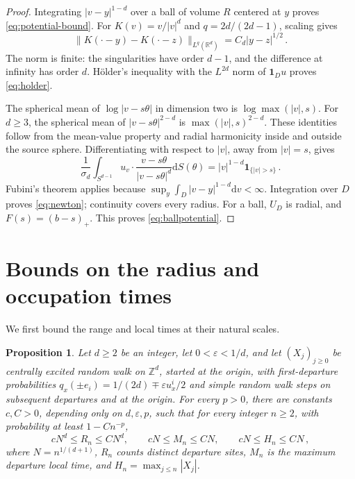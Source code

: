 \documentclass[11pt]{amsart}
\theoremstyle{plain}
\newtheorem{proposition}[theorem]{Proposition}
\theoremstyle{definition}
\newcommand{\Z}{\mathbb Z}
\newcommand{\R}{\mathbb R}
\newcommand{\eps}{\varepsilon}
\newcommand{\ind}{\mathbf 1}
\newcommand{\dd}{\mathrm d}
\begin{document}
\begin{proof}
Integrating $|v-y|^{1-d}$ over a ball of volume $R$ centered at $y$ proves
\eqref{eq:potential-bound}. For $K(v)=v/|v|^d$ and
$q=2d/(2d-1)$, scaling gives
\begin{equation}\label{eq:kernel-modulus}
\|K(\cdot-y)-K(\cdot-z)\|_{L^q(\R^d)}=C_d|y-z|^{1/2}\, .
\end{equation}
The norm is finite: the singularities have order $d-1$, and the
difference at infinity has order $d$. H\"older's inequality with
the $L^{2d}$ norm of $\ind_Du$ proves \eqref{eq:holder}.

The spherical mean of $\log|v-s\theta|$ in dimension two is
$\log\max(|v|,s)$. For $d\geq3$, the spherical mean of
$|v-s\theta|^{2-d}$ is $\max(|v|,s)^{2-d}$.
These identities follow from the mean-value property and radial
harmonicity inside and outside the source sphere.
Differentiating with respect to $|v|$, away from $|v|=s$, gives
\begin{equation}\label{eq:kernel-average}
\frac1{\sigma_d}\int_{S^{d-1}}
u_v\cdot\frac{v-s\theta}{|v-s\theta|^d}\dd S(\theta)
=|v|^{1-d}\ind_{\{|v|>s\}}\, .
\end{equation}
Fubini's theorem applies because
$\sup_y\int_D|v-y|^{1-d}\dd v<\infty$.
Integration over $D$ proves \eqref{eq:newton}; continuity covers
every radius. For a ball, $U_D$ is radial, and
$F(s)=(b-s)_+$. This proves \eqref{eq:ballpotential}.
\end{proof}
\section{Bounds on the radius and occupation times}\label{sec:coarse}
We first bound the range and local times at their natural scales.

\begin{proposition}\label{prop:coarse}
Let $d\geq2$ be an integer, let $0<\eps<1/d$, and let $(X_j)_{j\geq0}$ be centrally
excited random walk on $\Z^d$, started at the origin, with first-departure probabilities
$q_x(\pm e_i)=1/(2d)\mp\eps u_x^i/2$ and simple random walk steps
on subsequent departures and at the origin. For every $p>0$, there are constants
$c,C>0$, depending only on $d,\eps,p$, such that for every integer
$n\geq2$, with probability at least $1-Cn^{-p}$,
\begin{equation}\label{eq:coarse}
cN^d\leq R_n\leq CN^d ,\qquad
cN\leq M_n\leq CN ,\qquad cN\leq H_n\leq CN\, ,
\end{equation}
where $N=n^{1/(d+1)}$, $R_n$ counts distinct departure sites,
$M_n$ is the maximum departure local time, and
$H_n=\max_{j\leq n}|X_j|$.
\end{proposition}
\end{document}
